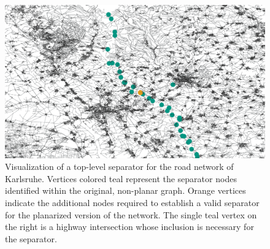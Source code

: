\begin{figure}[tbhp]
    \centering
    \includegraphics[width=0.8\linewidth]{graphics/karlsruhe_top_level_sep_extended_to_planar_wide.png}
    \caption{Visualization of a top-level separator for the road network of Karlsruhe. Vertices colored teal represent the separator nodes identified within the original, non-planar graph. Orange vertices indicate the additional nodes required to establish a valid separator for the planarized version of the network. The single teal vertex on the right is a highway intersection whose inclusion is necessary for the separator.}
    \label{fig:karlsruhe_planar_vs_non_planar}
\end{figure}

